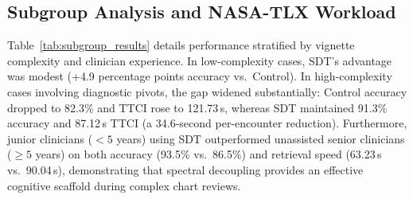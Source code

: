 \documentclass[10pt, onecolumn]{article}
\begin{document}
\subsection{Subgroup Analysis and NASA-TLX Workload}
Table~\ref{tab:subgroup_results} details performance stratified by vignette complexity and clinician experience. In low-complexity cases, SDT's advantage was modest (+4.9 percentage points accuracy vs.\ Control). In high-complexity cases involving diagnostic pivots, the gap widened substantially: Control accuracy dropped to 82.3\% and TTCI rose to 121.73\,s, whereas SDT maintained 91.3\% accuracy and 87.12\,s TTCI (a 34.6-second per-encounter reduction). Furthermore, junior clinicians ($<5$ years) using SDT outperformed unassisted senior clinicians ($\ge 5$ years) on both accuracy (93.5\% vs.\ 86.5\%) and retrieval speed (63.23\,s vs.\ 90.04\,s), demonstrating that spectral decoupling provides an effective cognitive scaffold during complex chart reviews.
\end{document}
